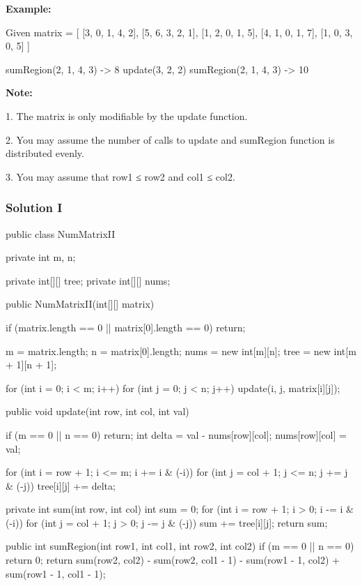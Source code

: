 \textbf{Example:}

\begin{Code}
Given matrix = [
  [3, 0, 1, 4, 2],
  [5, 6, 3, 2, 1],
  [1, 2, 0, 1, 5],
  [4, 1, 0, 1, 7],
  [1, 0, 3, 0, 5]
]

sumRegion(2, 1, 4, 3) -> 8
update(3, 2, 2)
sumRegion(2, 1, 4, 3) -> 10
\end{Code}

\textbf{Note:}

1. The matrix is only modifiable by the update function.

2. You may assume the number of calls to update and sumRegion function is distributed evenly.

3. You may assume that row1 ≤ row2 and col1 ≤ col2.

\subsubsection{Solution I}

\begin{Code}
public class NumMatrixII {
    private int m, n;

    private int[][] tree;
    private int[][] nums;

    public NumMatrixII(int[][] matrix) {
        if (matrix.length == 0 || matrix[0].length == 0) {
            return;
        }

        m = matrix.length;
        n = matrix[0].length;
        nums = new int[m][n];
        tree = new int[m + 1][n + 1];

        for (int i = 0; i < m; i++) {
            for (int j = 0; j < n; j++) {
                update(i, j, matrix[i][j]);
            }
        }
    }

    public void update(int row, int col, int val) {
        if (m == 0 || n == 0) {
            return;
        }
        int delta = val - nums[row][col];
        nums[row][col] = val;

        for (int i = row + 1; i <= m; i += i & (-i)) {
            for (int j = col + 1; j <= n; j += j & (-j)) {
                tree[i][j] += delta;
            }
        }
    }

    private int sum(int row, int col) {
        int sum = 0;
        for (int i = row + 1; i > 0; i -= i & (-i)) {
            for (int j = col + 1; j > 0; j -= j & (-j)) {
                sum += tree[i][j];
            }
        }
        return sum;
    }

    public int sumRegion(int row1, int col1, int row2, int col2) {
        if (m == 0 || n == 0) {
            return 0;
        }
        return sum(row2, col2) - sum(row2, col1 - 1) - sum(row1 - 1, col2) + sum(row1 - 1, col1 - 1);
    }
}
\end{Code}

